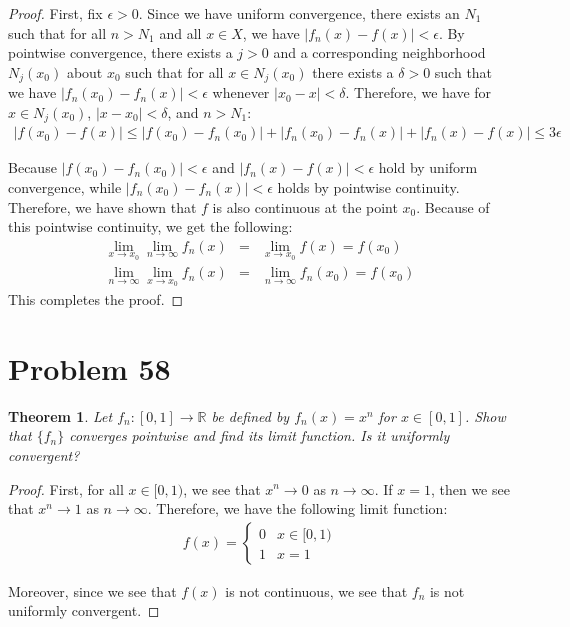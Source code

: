 \documentclass[psamsfonts]{amsart}
\newtheorem{thm}{Theorem}[section]
\theoremstyle{definition}
\theoremstyle{remark}
\numberwithin{equation}{section}
\begin{document}
\begin{proof}
First, fix $\epsilon > 0$. Since we have uniform convergence, there exists an $N_1$ such that for all $n > N_1$ and all $x \in X$, we have $|f_n(x) - f(x)| < \epsilon$. By pointwise convergence, there exists a $j > 0$ and a corresponding neighborhood $N_j (x_0)$ about $x_0$ such that for all $x \in N_j (x_0)$ there exists a $\delta > 0$ such that we have $|f_n(x_0) - f_n(x) | <\epsilon$ whenever $|x_0 - x| < \delta$. Therefore, we have for $x \in N_j(x_0)$, $|x - x_0| < \delta$, and $n > N_1$:
\begin{eqnarray}
|f(x_0) - f(x)| \leq |f(x_0) - f_n(x_0)| + |f_n(x_0) - f_n(x)| + |f_n(x) - f(x)| \leq 3 \epsilon
\end{eqnarray}

Because $|f(x_0) - f_n(x_0)| < \epsilon$ and $|f_n(x) - f(x)| < \epsilon$ hold by uniform convergence, while $|f_n(x_0) - f_n(x)| < \epsilon$ holds by pointwise continuity. Therefore, we have shown that $f$ is also continuous at the point $x_0$. Because of this pointwise continuity, we get the following:
\begin{eqnarray}
\lim_{x \to x_0} \lim_{n \to \infty} f_n(x) &=& \lim_{x \to x_0} f(x) = f(x_0) \\
\lim_{n \to \infty} \lim_{x \to x_0} f_n(x) &=& \lim_{n \to \infty} f_n(x_0) = f(x_0) 
\end{eqnarray}
This completes the proof.
\end{proof}

\section{Problem 58}

\begin{thm}
Let $f_n: [0,1] \to \mathbb{R}$ be defined by $f_n(x) = x^n$ for $x \in [0,1]$. Show that $\{ f_n \}$ converges pointwise and find its limit function. Is it uniformly convergent?
\end{thm}

\begin{proof}
First, for all $x \in [0,1)$, we see that $x^n \to 0$ as $n \to \infty$. If $x = 1$, then we see that $x^n \to 1$ as $n \to \infty$. Therefore, we have the following limit function:
\begin{eqnarray}
f(x) = \left\{ \begin{array}{ll}
0 & x \in [0,1) \\
1 & x = 1 \end{array} \right.
\end{eqnarray}

Moreover, since we see that $f(x)$ is not continuous, we see that $f_n$ is not uniformly convergent.
\end{proof}
\end{document}
